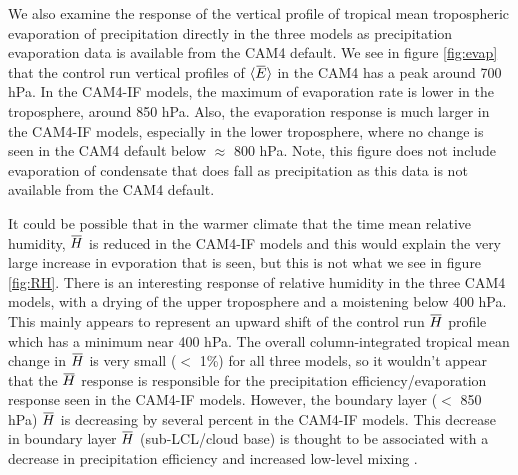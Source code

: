 \documentclass[letterpaper,12pt,titlepage,oneside,final]{book}
\newcommand{\overbar}[1]{\mkern 1.5mu\overline{\mkern-1.5mu#1\mkern-1.5mu}\mkern 1.5mu}
\begin{document}
We also examine the response of the vertical profile of tropical mean tropospheric evaporation of precipitation directly in the three models as precipitation evaporation data is available from the CAM4 default. We see in figure \ref{fig:evap} that the control run vertical profiles of $\langle{\overbar{E}}\rangle$ in the CAM4 has a peak around 700 hPa. In the CAM4-IF models, the maximum of evaporation rate is lower in the troposphere, around 850 hPa. Also, the evaporation response is much larger in the CAM4-IF models, especially in the lower troposphere, where no change is seen in the CAM4 default below $\approx$ 800 hPa. Note, this figure does not include evaporation of condensate that does fall as precipitation as this data is not available from the CAM4 default.

It could be possible that in the warmer climate that the time mean relative humidity, $\overbar{H}$ is reduced in the CAM4-IF models and this would explain the very large increase in evporation that is seen, but this is not what we see in figure \ref{fig:RH}. There is an interesting response of relative humidity in the three CAM4 models, with a drying of the upper troposphere and a moistening below 400 hPa. This mainly appears to represent an upward shift of the control run $\overbar{H}$  profile which has a minimum near 400 hPa. The overall column-integrated tropical mean change in $\overbar{H}$ is very small ($<$ 1\%) for all three models, so it wouldn't appear that the $\overbar{H}$ response is responsible for the precipitation efficiency/evaporation response seen in the CAM4-IF models. However, the boundary layer ($<$ 850 hPa) $\overbar{H}$  is decreasing by several percent in the CAM4-IF models. This decrease in boundary layer $\overbar{H}$ (sub-LCL/cloud base) is thought to be associated with a decrease in precipitation efficiency \citep{market_precipitation_2003,sherwood_spread_2014} and increased low-level mixing \citep{sherwood_spread_2014}. 
\end{document}
